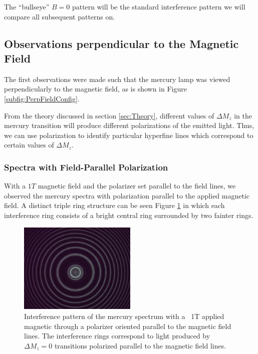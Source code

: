 \documentclass[twocolumn]{article}
\begin{document}
	 The ``bullseye'' $B=0$ pattern will be the standard interference pattern we will compare all subsequent patterns on.
	 
	\subsection{Observations perpendicular to the Magnetic Field}
		The first observations were made such that the mercury lamp was viewed perpendicularly to the magnetic field, as is shown in Figure \ref{subfig:PerpFieldConfig}.
		
		From the theory discussed in section \ref{sec:Theory}, different values of $\Delta M_z$ in the mercury transition will produce different polarizations of the emitted light.
		Thus, we can use polarization to identify particular hyperfine lines which correspond to certain values of $\Delta M_z$.
		\subsubsection{Spectra with Field-Parallel Polarization}
			
			With a $1T$ magnetic field and the polarizer set parallel to the field lines, we observed the mercury spectra with polarization parallel to the applied magnetic field. A distinct triple ring structure can be seen Figure \ref{fig:Triplet90deg} in which each interference ring consists of a bright central ring surrounded by two fainter rings. 
			
			\begin{figure}
				\centering
				\includegraphics[width=0.5\textwidth]{Images/Run1_ParallelPolarizer}
				\caption{Interference pattern of the mercury spectrum with a ~1T applied magnetic through a polarizer oriented parallel to the magnetic field lines. The interference rings correspond to light produced by $\Delta M_z = 0$ transitions polarized parallel to the magnetic field lines.}
				\label{fig:Triplet90deg}
			\end{figure}
			
\end{document}
